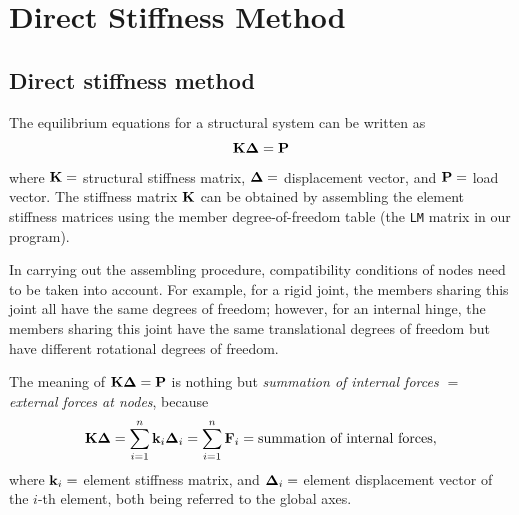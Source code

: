 \chapter{Direct Stiffness Method}
\label{ch:dsm}

\section{Direct stiffness method}
The equilibrium equations for a structural system can be written as
\begin{equation}
  \mathbf{K}\bm{\Delta} = \mathbf{P}
\end{equation}
where $\mathbf{K} =$ structural stiffness matrix, $\bm{\Delta} =$ displacement vector, and $\mathbf{P} =$ load vector. The stiffness matrix $\mathbf{K}$ can be obtained by assembling the element stiffness matrices using the member degree-of-freedom table (the \texttt{LM} matrix in our program).

In carrying out the assembling procedure, compatibility conditions of nodes need to be taken into account. For example, for a rigid joint, the members sharing this joint all have the same degrees of freedom; however, for an internal hinge, the members sharing this joint have the same translational degrees of freedom but have different rotational degrees of freedom.

The meaning of $\mathbf{K}\bm{\Delta} = \mathbf{P}$ is nothing but \emph{summation of internal forces $=$ external forces at nodes}, because
\begin{equation*}
  \mathbf{K}\bm{\Delta} = \sum_{i=1}^{n}\mathbf{k}_i\bm{\Delta}_i = \sum_{i=1}^{n}\mathbf{F}_i = \text{summation of internal forces},
\end{equation*}
where $\mathbf{k}_i =$ element stiffness matrix, and $\bm{\Delta}_i =$ element displacement vector of the $i$-th element, both being referred to the global axes.
\begin{fig}
  
\end{fig}


